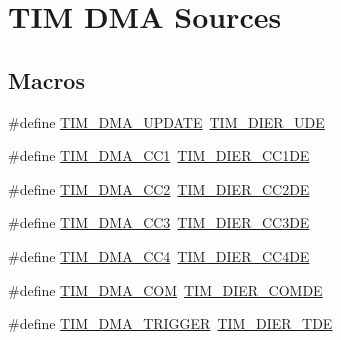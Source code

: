 \hypertarget{group___t_i_m___d_m_a__sources}{}\section{T\+IM D\+MA Sources}
\label{group___t_i_m___d_m_a__sources}
\subsection*{Macros}
\begin{DoxyCompactItemize}
\item 
\#define \hyperlink{group___t_i_m___d_m_a__sources_ga45816ad15a4f533027eb202ac0b9aaf5}{T\+I\+M\+\_\+\+D\+M\+A\+\_\+\+U\+P\+D\+A\+TE}~\hyperlink{group___peripheral___registers___bits___definition_gab9f47792b1c2f123464a2955f445c811}{T\+I\+M\+\_\+\+D\+I\+E\+R\+\_\+\+U\+DE}
\item 
\#define \hyperlink{group___t_i_m___d_m_a__sources_ga33b93e8bb82fe8e167b9e9c962c54f83}{T\+I\+M\+\_\+\+D\+M\+A\+\_\+\+C\+C1}~\hyperlink{group___peripheral___registers___bits___definition_gae181bb16ec916aba8ba86f58f745fdfd}{T\+I\+M\+\_\+\+D\+I\+E\+R\+\_\+\+C\+C1\+DE}
\item 
\#define \hyperlink{group___t_i_m___d_m_a__sources_ga792f73196a8e7424655592097d7a3fd5}{T\+I\+M\+\_\+\+D\+M\+A\+\_\+\+C\+C2}~\hyperlink{group___peripheral___registers___bits___definition_ga58f97064991095b28c91028ca3cca28e}{T\+I\+M\+\_\+\+D\+I\+E\+R\+\_\+\+C\+C2\+DE}
\item 
\#define \hyperlink{group___t_i_m___d_m_a__sources_ga3eb2dadbd3109bced45935fb53deeee1}{T\+I\+M\+\_\+\+D\+M\+A\+\_\+\+C\+C3}~\hyperlink{group___peripheral___registers___bits___definition_ga1567bff5dc0564b26a8b3cff1f0fe0a4}{T\+I\+M\+\_\+\+D\+I\+E\+R\+\_\+\+C\+C3\+DE}
\item 
\#define \hyperlink{group___t_i_m___d_m_a__sources_ga59495cf79894dfe5e5b2029863aed956}{T\+I\+M\+\_\+\+D\+M\+A\+\_\+\+C\+C4}~\hyperlink{group___peripheral___registers___bits___definition_gaaba034412c54fa07024e516492748614}{T\+I\+M\+\_\+\+D\+I\+E\+R\+\_\+\+C\+C4\+DE}
\item 
\#define \hyperlink{group___t_i_m___d_m_a__sources_gac5f4c56e944bda8ba0c23b97275020ba}{T\+I\+M\+\_\+\+D\+M\+A\+\_\+\+C\+OM}~\hyperlink{group___peripheral___registers___bits___definition_ga79c3fab9d33de953a0a7f7d6516c73bc}{T\+I\+M\+\_\+\+D\+I\+E\+R\+\_\+\+C\+O\+M\+DE}
\item 
\#define \hyperlink{group___t_i_m___d_m_a__sources_ga21912fd910242e0f63bf9b0953e41c63}{T\+I\+M\+\_\+\+D\+M\+A\+\_\+\+T\+R\+I\+G\+G\+ER}~\hyperlink{group___peripheral___registers___bits___definition_ga5a752d4295f100708df9b8be5a7f439d}{T\+I\+M\+\_\+\+D\+I\+E\+R\+\_\+\+T\+DE}
\end{DoxyCompactItemize}


